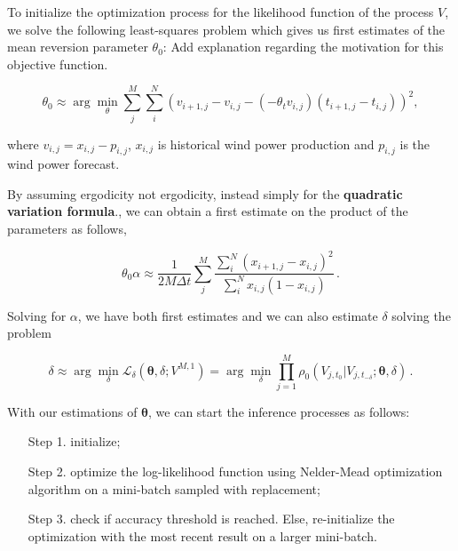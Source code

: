 \documentclass[11pt]{article}
\theoremstyle{definition}
\begin{document}
To initialize the optimization process for the likelihood function of the process $V$, we solve the following least-squares problem which gives us first estimates of the mean reversion parameter $\theta_0$: {\color{red} Add explanation regarding the motivation for this objective function.}

\begin{equation}
\theta_0\approx\arg\min_{\theta} \sum\limits_{j}^M \sum\limits_i^N \left( v_{i+1,j}  - v_{i,j}- \left( - \theta_t v_{i,j}\right) \left(t_{i+1,j} - t_{i,j} \right)  \right)^2,
\label{inital_theta}
\end{equation}
 
 where $v_{i,j}=x_{i,j}-p_{i,j}$,  $x_{i,j}$ is historical wind power production and $p_{i,j}$ is the wind power forecast.
 
 By assuming ergodicity {\color{red} not ergodicity, instead simply for the \textbf{quadratic variation formula}.}, we can obtain a first estimate on the product of the parameters as follows,
 
\begin{equation}
\theta_0 \alpha \approx \frac{1}{2M\Delta t} \sum\limits_j^M \frac{ \sum\limits_i^N (x_{i+1,j}  - x_{i,j})^2}{ \sum\limits_i^N x_{i,j}(1-x_{i,j}) } \,.
\end{equation}

Solving for $\alpha$, we have both first estimates and we can also estimate $\delta$ solving the problem


\begin{equation}
\delta\approx\arg\min_{\delta}\mathcal{L}_{\delta}(\bm{\theta},\delta; V^{M,1}) = \arg\min_{\delta}\prod\limits_{j=1}^M \rho_0 (V_{j, t_0}|V_{j, t_{-\delta}};\bm{\theta},\delta) \,.
\label{likelihood_delta}
\end{equation}

With our estimations of $\bm{\theta}$, we can start the inference processes as follows:
\begin{enumerate}
\item[Step 1.]  initialize;
\item[Step 2.]  optimize the log-likelihood function using  Nelder-Mead optimization algorithm on a mini-batch sampled with replacement;
\item[Step 3.] check if  accuracy threshold is reached. Else, re-initialize the optimization with the most recent result on a larger mini-batch.
\end{enumerate}

\end{document}
